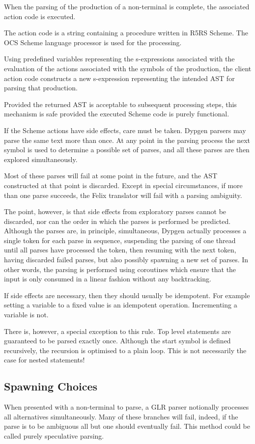 \documentclass[oneside]{book}
\begin{document}
When the parsing of the production of a non-terminal is 
complete, the associated action code is executed.

The action code is a string containing a procedure
written in R5RS Scheme. The OCS Scheme language processor
is used for the processing.

Using predefined variables representing the s-expressions
associated with the evaluation of the actions associated
with the symbols of the production, the client action
code constructs a new s-expression representing the
intended AST for parsing that production.

Provided the returned AST is acceptable to subsequent
processing steps, this mechanism is safe provided the
executed Scheme code is purely functional.

If the Scheme actions have side effects, care must be taken.
Dypgen parsers may parse the same text more than once.
At any point in the parsing process the next symbol
is used to determine a possible set of parses, and all
these parses are then explored simultaneously.

Most of these parses will fail at some point in the
future, and the AST constructed at that point is discarded.
Except in special circumstances, if more than one parse
succeeds, the Felix translator will fail with a parsing
ambiguity.

The point, however, is that side effects from exploratory
parses cannot be discarded, nor can the order in which
the parses is performed be predicted. Although the parses
are, in principle, simultaneous, Dypgen actually processes
a single token for each parse in sequence, suspending the
parsing of one thread until all parses have processed
the token, then resuming with the next token, having
discarded failed parses, but also possibly spawning a new
set of parses. In other words, the parsing is performed
using coroutines which ensure that the input is only
consumed in a linear fashion without any backtracking.

If side effects are necessary, then they should usually
be idempotent. For example setting a variable to a fixed
value is an idempotent operation. Incrementing a variable is not.

There is, however, a special exception to this rule.
Top level statements are guaranteed to be parsed exactly once.
Although the start symbol is defined recursively, the recursion
is optimised to a plain loop. This is not necessarily the 
case for nested statements!

\subsection{Spawning Choices}
When presented with a non-terminal to parse, a GLR parser
notionally processes all alternatives simultaneously.
Many of these branches will fail, indeed, if the parse
is to be ambiguous all but one should eventually fail.
This method could be called purely speculative parsing.
\end{document}
